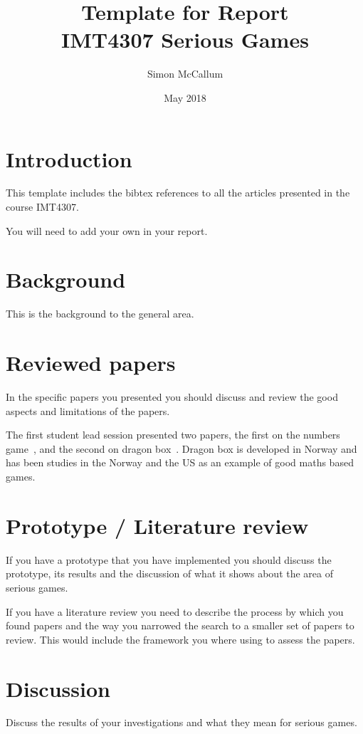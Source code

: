 \documentclass{article}
\title{Template for Report \\IMT4307 Serious Games}
\author{Simon McCallum}
\date{May 2018}
\begin{document}
\maketitle

\section{Introduction}
This template includes the bibtex references to all the articles presented in the course IMT4307.

You will need to add your own in your report.

\section{Background}

This is the background to the general area.

\section{Reviewed papers}

In the specific papers you presented you should discuss and review the good aspects and limitations of the papers.

The first student lead session presented two papers, the first on the numbers game~\cite{maas2017cognitive}, and the second on dragon box~\cite{siew2016students}.  Dragon box is developed in Norway and has been studies in the Norway and the US as an example of good maths based games. 

\section{Prototype / Literature review}

If you have a prototype that you have implemented you should discuss the prototype, its results and the discussion of what it shows about the area of serious games.

If you have a literature review you need to describe the process by which you found papers and the way you narrowed the search to a smaller set of papers to review.  This would include the framework you where using to assess the papers.


\section{Discussion}

Discuss the results of your investigations and what they mean for serious games.
\end{document}

